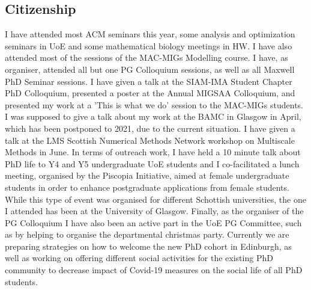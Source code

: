 \documentclass[11pt, a4paper]{article}
\theoremstyle{definition}
\begin{document}
\subsection{Citizenship}
I have attended most ACM seminars this year, some analysis and optimization seminars in UoE and some mathematical biology meetings in HW. I have also attended most of the sessions of the MAC-MIGs Modelling course. I have, as organiser, attended all but one PG Colloquium sessions, as well as all Maxwell PhD Seminar sessions.
I have given a talk at the SIAM-IMA Student Chapter PhD Colloquium, presented a poster at the Annual MIGSAA Colloquium, and presented my work at a 'This is what we do' session to the MAC-MIGs students. I was supposed to give a talk about my work at the BAMC in Glasgow in April, which has been postponed to 2021, due to the current situation. I have given a talk at the LMS Scottish Numerical Methods Network workshop on Multiscale Methods in June. In terms of outreach work, I have held a 10 minute talk about PhD life to Y4 and Y5 undergraduate UoE students and I co-facilitated a lunch meeting, organised by the Piscopia Initiative, aimed at female undergraduate students in order to enhance postgraduate applications from female students. While this type of event was organised for different Schottish universities, the one I attended has been at the University of Glasgow.
Finally, as the organiser of the PG Colloquium I have also been an active part in the UoE PG Committee, such as by helping to organise the departmental christmas party. Currently we are preparing strategies on how to welcome the new PhD cohort in Edinburgh, as well as working on offering different social activities for the existing PhD community to decrease impact of Covid-19 measures on the social life of all PhD students.
\end{document}
